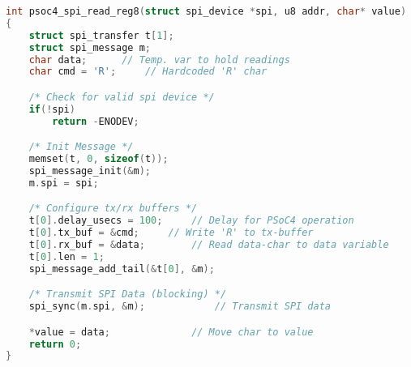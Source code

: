 \begin{lstlisting}[language=C]
int psoc4_spi_read_reg8(struct spi_device *spi, u8 addr, char* value)
{
	struct spi_transfer t[1];
	struct spi_message m;
	char data;		// Temp. var to hold readings
	char cmd = 'R';		// Hardcoded 'R' char

	/* Check for valid spi device */
	if(!spi)
		return -ENODEV;

	/* Init Message */
	memset(t, 0, sizeof(t));
	spi_message_init(&m);
	m.spi = spi;

	/* Configure tx/rx buffers */
	t[0].delay_usecs = 100;		// Delay for PSoC4 operation
	t[0].tx_buf = &cmd;		// Write 'R' to tx-buffer
	t[0].rx_buf = &data;		// Read data-char to data variable
	t[0].len = 1;
	spi_message_add_tail(&t[0], &m);

	/* Transmit SPI Data (blocking) */
	spi_sync(m.spi, &m);			// Transmit SPI data

	*value = data;				// Move char to value
	return 0;
}
\end{lstlisting}
